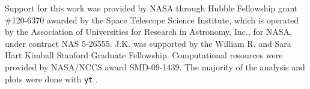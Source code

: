 \documentclass[apj,onecolumn]{emulateapj}
\begin{document}
\acknowledgments

Support for this work was provided by NASA through Hubble Fellowship
grant \#120-6370 awarded by the Space Telescope Science Institute,
which is operated by the Association of Universities for Research in
Astronomy, Inc., for NASA, under contract NAS 5-26555.  J.K. was
supported by the William R. and Sara Hart Kimball Stanford Graduate
Fellowship.  Computational resources were provided by NASA/NCCS award
SMD-09-1439.  The majority of the analysis and plots were done with
\texttt{yt} \citep{yt}.

%

\end{document}
